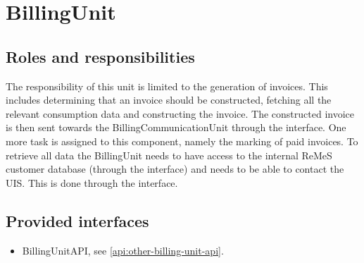 \section{BillingUnit}
\label{element:billing-unit}

\subsection{Roles and responsibilities}

\npar The responsibility of this unit is limited to the generation of invoices.
This includes determining that an invoice should be constructed, fetching all
the relevant consumption data and constructing the invoice. The constructed
invoice is then sent towards the BillingCommunicationUnit through the
 interface. One more task is assigned to this
component, namely the marking of paid invoices. To retrieve all data the
BillingUnit needs to have access to the internal ReMeS customer database
(through the  interface) and needs to be able to
contact the UIS. This is done through the 
interface.

\subsection{Provided interfaces}

\begin{itemize}
  \item BillingUnitAPI, see \ref{api:other-billing-unit-api}.
\end{itemize}